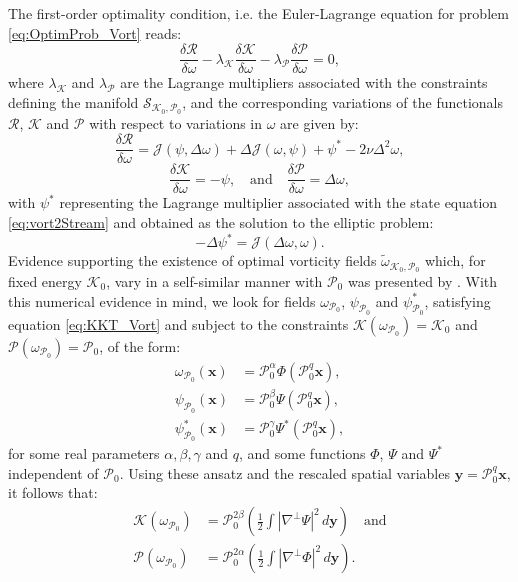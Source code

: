 \documentclass[11pt]{article}
\def\J{{\mathcal{J}}}
\def\P{{\mathcal{P}}}
\def\R{{\mathcal{R}}}
\def\K{{\mathcal{K}}}
\def\twKP{\tilde{\omega}_{\K_0,\P_0}}
\newcommand{\xvec}{\mathbf{x}}
\newcommand{\yvec}{\mathbf{y}}
\newcommand{\laplacian}{\Delta}
\newcommand{\nablaperp}{\nabla^{\perp}}
\begin{document}
The first-order optimality condition, i.e. the Euler-Lagrange equation for problem \eqref{eq:OptimProb_Vort} reads:
\begin{equation}\label{eq:KKT_Vort}
\frac{\delta\R}{\delta\omega} - \lambda_{\K}\frac{\delta\K}{\delta\omega} - \lambda_{\P}\frac{\delta\P}{\delta\omega} = 0,
\end{equation}
where $\lambda_{\K}$ and $\lambda_{\P}$ are the Lagrange multipliers associated with the constraints defining the manifold $\mathcal{S}_{\K_0,\P_0}$, and the corresponding variations of the functionals $\R$, $\K$ and $\P$ with respect to variations in $\omega$ are given by:
\[
\frac{\delta\R}{\delta\omega} = \J(\psi,\laplacian\omega) + \laplacian\J(\omega,\psi) + \psi^* - 2\nu\laplacian^2\omega, 
\]
\[
\frac{\delta\K}{\delta\omega} = -\psi, \quad\mbox{and}\quad 
\frac{\delta\P}{\delta\omega} = \laplacian\omega, 
\]
with $\psi^*$ representing the Lagrange multiplier associated with the state equation \eqref{eq:vort2Stream} and obtained as the solution to the elliptic problem:
\begin{equation}\label{eq:vort2Stream_Adj}
-\laplacian\psi^* = \J(\laplacian\omega,\omega).
\end{equation}
Evidence supporting the existence of optimal vorticity fields $\twKP$ which, for fixed energy $\K_0$, vary in a self-similar manner with $\P_0$ was presented by \cite{ap13a}. With this numerical evidence in mind, we look for fields $\omega_{\P_0}$, $\psi_{\P_0}$ and $\psi^*_{\P_0}$, satisfying equation \eqref{eq:KKT_Vort} and subject to the constraints $\K(\omega_{\P_0}) = \K_0$ and $\P(\omega_{\P_0}) = \P_0$, of the form:
\[
\begin{aligned}
\omega_{\P_0}(\xvec) & = \P_0^\alpha\Phi(\P_0^q \xvec), \\
\psi_{\P_0}(\xvec) & = \P_0^\beta\Psi(\P_0^q \xvec), \\
\psi^*_{\P_0}(\xvec) & = \P_0^\gamma\Psi^*(\P_0^q \xvec),
\end{aligned}
\] 
for some real parameters $\alpha,\beta,\gamma$ and $q$, and some functions $\Phi$, $\Psi$ and $\Psi^*$  independent of $\P_0$. Using these ansatz and the rescaled spatial variables $\yvec =  \P_0^q\xvec$, it follows that:
\begin{subequations}
\begin{align}
\K(\omega_{\P_0}) & = \P_0^{2\beta}\left( \frac{1}{2}\int | \nablaperp\Psi |^2 \, d\yvec\right) \quad\mbox{and}\\
\P(\omega_{\P_0}) & = \P_0^{2\alpha}\left( \frac{1}{2}\int | \nablaperp\Phi |^2 \, d\yvec\right).
\end{align}
\end{subequations}
\end{document}

